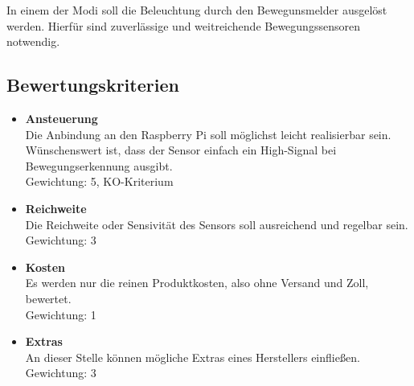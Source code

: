 In einem der Modi soll die Beleuchtung durch den Bewegunsmelder ausgelöst werden. Hierfür sind zuverlässige und weitreichende Bewegungssensoren notwendig.
\subsection{Bewertungskriterien}
\begin{itemize}
\item \textbf{Ansteuerung}\\
Die Anbindung an den Raspberry Pi soll möglichst leicht realisierbar sein. Wünschenswert ist, dass der Sensor einfach ein High-Signal bei Bewegungserkennung ausgibt. \\
Gewichtung: 5, KO-Kriterium
\item \textbf{Reichweite}\\
Die Reichweite oder Sensivität des Sensors soll ausreichend und regelbar sein.\\
Gewichtung: 3
\item \textbf{Kosten}\\
Es werden nur die reinen Produktkosten, also ohne Versand und Zoll, bewertet. \\
Gewichtung: 1
\item \textbf{Extras}\\
An dieser Stelle können mögliche Extras eines Herstellers einfließen.\\
Gewichtung: 3
\end{itemize}

